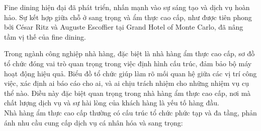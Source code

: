 Fine dining hiện đại đã phát triển, nhấn mạnh vào sự sáng tạo và dịch vụ hoàn hảo. Sự kết hợp giữa chỗ ở sang trọng và ẩm thực cao cấp, như được tiên phong bởi César Ritz và Auguste Escoffier tại Grand Hotel of Monte Carlo, đã nâng tầm vị thế của fine dining.


Trong ngành công nghiệp nhà hàng, đặc biệt là nhà hàng ẩm thực cao cấp, sơ đồ tổ chức đóng vai trò quan trọng trong việc định hình cấu trúc, đảm bảo bộ máy hoạt động hiệu quả. Biểu đồ tổ chức giúp làm rõ mối quan hệ giữa các vị trí công việc, xác định ai báo cáo cho ai, và ai chịu trách nhiệm cho những nhiệm vụ cụ thể nào. Điều này đặc biệt quan trọng trong nhà hàng ẩm thực cao cấp, nơi mà chất lượng dịch vụ và sự hài lòng của khách hàng là yếu tố hàng đầu. \\
Nhà hàng ẩm thực cao cấp thường có cấu trúc tổ chức phức tạp và đa tầng, phản ánh nhu cầu cung cấp dịch vụ cá nhân hóa và sang trọng:

